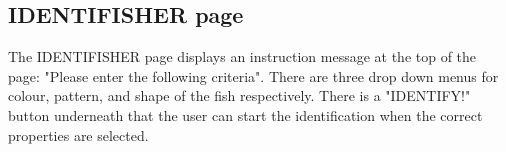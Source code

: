 \documentclass{article}
\begin{document}
\subsection{IDENTIFISHER page}
The IDENTIFISHER page displays an instruction message at the top of the page: "Please enter the following criteria". There are three
drop down menus for colour, pattern, and shape of the fish respectively. There is a "IDENTIFY!" button underneath that the user can
start the identification when the correct properties are selected.


\newpage
\listoffigures
\end{document}
